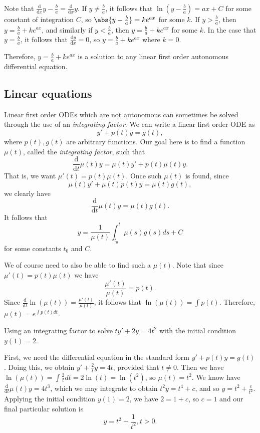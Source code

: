 \documentclass[12pt]{article}
\begin{document}
Note that $\frac{\mathrm{d}}{\mathrm{d}x}{y - \frac{b}{a}} = \frac{\mathrm{d}}{\mathrm{d}x}y$. If $y \neq \frac{b}{a}$, it follows that $\ln(y - \frac{b}{a}) = ax + C$ for some constant of integration $C$, so $\abs{y - \frac{b}{a}} = ke^{ax}$ for some $k$. If $y > \frac{b}{a}$, then $y = \frac{b}{a} + ke^{ax}$, and similarly if $y < \frac{b}{a}$, then $y = \frac{b}{a} + ke^{ax}$ for some $k$. In the case that $y = \frac{b}{a}$, it follows that $\frac{\mathrm{d}y}{\mathrm{d}x} = 0$, so $y = \frac{b}{a} + ke^{ax}$ where $k = 0$.

Therefore, $y = \frac{b}{a} + ke^{ax}$ is a solution to any linear first order autonomous differential equation.

\subsection{Linear equations}

Linear first order ODEs which are not autonomous can sometimes be solved through the use of an \emph{integrating factor}. We can write a linear first order ODE as \[y' + p(t)y = g(t),\] where $p(t), g(t)$ are arbitrary functions. Our goal here is to find a function $\mu(t)$, called the \emph{integrating factor}, such that
\[\frac{\mathrm{d}}{\mathrm{d}t}\mu(t)y = \mu(t)y' + p(t)\mu(t)y.\] That is, we want $\mu'(t) = p(t)\mu(t)$. Once such $\mu(t)$ is found, since \[\mu(t)y' + \mu(t)p(t)y = \mu(t)g(t),\] we clearly have \[\frac{\mathrm{d}}{\mathrm{d}t}\mu(t)y = \mu(t)g(t).\] It follows that \[y = \frac{1}{\mu(t)}\int_{t_0}^t \mu(s)g(s)ds + C\] for some constants $t_0$ and $C$.

We of course need to also be able to find such a $\mu(t)$. Note that since $\mu'(t) = p(t)\mu(t)$ we have \[\frac{\mu'(t)}{\mu(t)} = p(t).\] Since $\frac{\mathrm{d}}{\mathrm{d}t}\ln(\mu(t)) = \frac{\mu'(t)}{\mu(t)}$, it follows that $\ln(\mu(t)) = \int p(t)$. Therefore, $\mu(t) = e^{\int p(t)dt}$.

\begin{exmp}
    Using an integrating factor to solve $ty' + 2y = 4t^2$ with the initial condition $y(1) = 2$.

    First, we need the differential equation in the standard form $y' + p(t)y = g(t)$. Doing this, we obtain $y' + \frac{2}{t}y = 4t$, provided that $t \neq 0$. Then we have $\ln(\mu(t)) = \int \frac{2}{t}dt = 2\ln(t) = \ln(t^2)$, so $\mu(t) = t^2$. We know have $\frac{\mathrm{d}}{\mathrm{d}t}\mu(t)y = 4t^3$, which we may integrate to obtain $t^2y = t^4 + c$, and so $y = t^2 + \frac{c}{t^2}$. Applying the initial condition $y(1) = 2$, we have $2 = 1 + c$, so $c = 1$ and our final particular solution is \[y = t^2 + \frac{1}{t^2}, t > 0.\]
\end{exmp}
\end{document}
